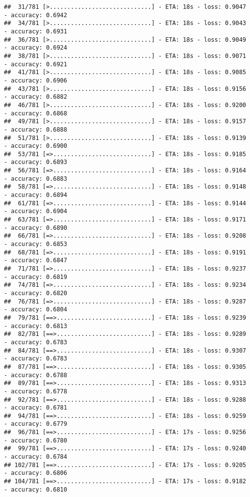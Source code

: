 \documentclass[
]{article}
\begin{document}
\begin{verbatim}
##  31/781 [>.............................] - ETA: 18s - loss: 0.9047 - accuracy: 0.6942
##  34/781 [>.............................] - ETA: 18s - loss: 0.9043 - accuracy: 0.6931
##  36/781 [>.............................] - ETA: 18s - loss: 0.9049 - accuracy: 0.6924
##  38/781 [>.............................] - ETA: 18s - loss: 0.9071 - accuracy: 0.6921
##  41/781 [>.............................] - ETA: 18s - loss: 0.9085 - accuracy: 0.6906
##  43/781 [>.............................] - ETA: 18s - loss: 0.9156 - accuracy: 0.6882
##  46/781 [>.............................] - ETA: 18s - loss: 0.9200 - accuracy: 0.6868
##  49/781 [>.............................] - ETA: 18s - loss: 0.9157 - accuracy: 0.6888
##  51/781 [>.............................] - ETA: 18s - loss: 0.9139 - accuracy: 0.6900
##  53/781 [=>............................] - ETA: 18s - loss: 0.9185 - accuracy: 0.6893
##  56/781 [=>............................] - ETA: 18s - loss: 0.9164 - accuracy: 0.6883
##  58/781 [=>............................] - ETA: 18s - loss: 0.9148 - accuracy: 0.6894
##  61/781 [=>............................] - ETA: 18s - loss: 0.9144 - accuracy: 0.6904
##  63/781 [=>............................] - ETA: 18s - loss: 0.9171 - accuracy: 0.6890
##  66/781 [=>............................] - ETA: 18s - loss: 0.9208 - accuracy: 0.6853
##  68/781 [=>............................] - ETA: 18s - loss: 0.9191 - accuracy: 0.6847
##  71/781 [=>............................] - ETA: 18s - loss: 0.9237 - accuracy: 0.6819
##  74/781 [=>............................] - ETA: 18s - loss: 0.9234 - accuracy: 0.6820
##  76/781 [=>............................] - ETA: 18s - loss: 0.9287 - accuracy: 0.6804
##  79/781 [==>...........................] - ETA: 18s - loss: 0.9239 - accuracy: 0.6813
##  82/781 [==>...........................] - ETA: 18s - loss: 0.9289 - accuracy: 0.6783
##  84/781 [==>...........................] - ETA: 18s - loss: 0.9307 - accuracy: 0.6783
##  87/781 [==>...........................] - ETA: 18s - loss: 0.9305 - accuracy: 0.6788
##  89/781 [==>...........................] - ETA: 18s - loss: 0.9313 - accuracy: 0.6778
##  92/781 [==>...........................] - ETA: 18s - loss: 0.9288 - accuracy: 0.6781
##  94/781 [==>...........................] - ETA: 18s - loss: 0.9259 - accuracy: 0.6779
##  96/781 [==>...........................] - ETA: 17s - loss: 0.9256 - accuracy: 0.6780
##  99/781 [==>...........................] - ETA: 17s - loss: 0.9240 - accuracy: 0.6784
## 102/781 [==>...........................] - ETA: 17s - loss: 0.9205 - accuracy: 0.6806
## 104/781 [==>...........................] - ETA: 17s - loss: 0.9182 - accuracy: 0.6810

\end{verbatim}
\end{document}
